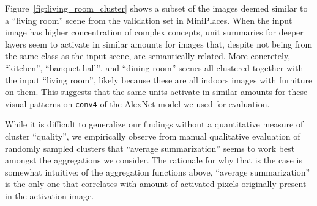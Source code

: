 Figure~\ref{fig:living_room_cluster} shows a subset of the images deemed similar to a ``living room'' scene from the validation set in MiniPlaces.  When the input image has higher concentration of complex concepts, unit summaries for deeper layers seem to activate in similar amounts for images that, despite not being from the same class as the input scene, are semantically related. More concretely, ``kitchen'', ``banquet hall'', and ``dining room'' scenes all clustered together with the input ``living room'', likely because these are all indoors images with furniture on them.  This suggests that the same units activate in similar amounts for these visual patterns on \texttt{conv4} of the AlexNet model we used for evaluation.

While it is difficult to generalize our findings without a quantitative measure of cluster ``quality'', we empirically observe from manual qualitative evaluation of randomly sampled clusters that ``average summarization'' seems to work best amongst the aggregations we consider. The rationale for why that is the case is somewhat intuitive: of the aggregation functions above, ``average summarization'' is the only one that correlates with amount of activated pixels originally present in the activation image.
